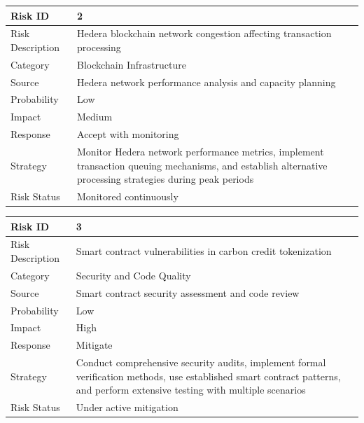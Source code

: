 \documentclass[oneside,a4paper,12pt]{book}
\renewcommand{\arraystretch}{1.5}
\begin{document}
\begin{table}[!htbp]
\begin{center}
\def\arraystretch{1.5}
\begin{tabularx}{\textwidth}{| l | X |}
\hline 
Risk ID	& 2 \\ \hline
Risk Description	& Hedera blockchain network congestion affecting transaction processing \\ \hline
Category	& Blockchain Infrastructure \\ \hline
Source	& Hedera network performance analysis and capacity planning \\ \hline
Probability	& Low \\ \hline
Impact	& Medium \\ \hline
Response	& Accept with monitoring \\ \hline
Strategy	& Monitor Hedera network performance metrics, implement transaction queuing mechanisms, and establish alternative processing strategies during peak periods \\ \hline
Risk Status	& Monitored continuously \\ \hline
\end{tabularx}
\end{center}
\label{tab:risk2}
\end{table}

\begin{table}[!htbp]
\begin{center}
\def\arraystretch{1.5}
\begin{tabularx}{\textwidth}{| l | X |}
\hline 
Risk ID	& 3 \\ \hline
Risk Description	& Smart contract vulnerabilities in carbon credit tokenization \\ \hline
Category	& Security and Code Quality \\ \hline
Source	& Smart contract security assessment and code review \\ \hline
Probability	& Low \\ \hline
Impact	& High \\ \hline
Response	& Mitigate \\ \hline
Strategy	& Conduct comprehensive security audits, implement formal verification methods, use established smart contract patterns, and perform extensive testing with multiple scenarios \\ \hline
Risk Status	& Under active mitigation \\ \hline
\end{tabularx}
\end{center}
\label{tab:risk3}
\end{table}
\end{document}
